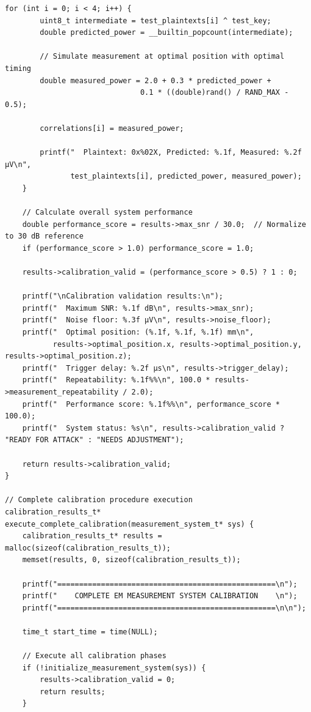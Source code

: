 \documentclass[11pt,a4paper]{article}
\theoremstyle{definition}
\begin{document}
\begin{lstlisting}[caption={Complete EM Calibration Implementation}]
    for (int i = 0; i < 4; i++) {
        uint8_t intermediate = test_plaintexts[i] ^ test_key;
        double predicted_power = __builtin_popcount(intermediate);
        
        // Simulate measurement at optimal position with optimal timing
        double measured_power = 2.0 + 0.3 * predicted_power + 
                               0.1 * ((double)rand() / RAND_MAX - 0.5);
        
        correlations[i] = measured_power;
        
        printf("  Plaintext: 0x%02X, Predicted: %.1f, Measured: %.2f μV\n",
               test_plaintexts[i], predicted_power, measured_power);
    }
    
    // Calculate overall system performance
    double performance_score = results->max_snr / 30.0;  // Normalize to 30 dB reference
    if (performance_score > 1.0) performance_score = 1.0;
    
    results->calibration_valid = (performance_score > 0.5) ? 1 : 0;
    
    printf("\nCalibration validation results:\n");
    printf("  Maximum SNR: %.1f dB\n", results->max_snr);
    printf("  Noise floor: %.3f μV\n", results->noise_floor);
    printf("  Optimal position: (%.1f, %.1f, %.1f) mm\n", 
           results->optimal_position.x, results->optimal_position.y, results->optimal_position.z);
    printf("  Trigger delay: %.2f μs\n", results->trigger_delay);
    printf("  Repeatability: %.1f%%\n", 100.0 * results->measurement_repeatability / 2.0);
    printf("  Performance score: %.1f%%\n", performance_score * 100.0);
    printf("  System status: %s\n", results->calibration_valid ? "READY FOR ATTACK" : "NEEDS ADJUSTMENT");
    
    return results->calibration_valid;
}

// Complete calibration procedure execution
calibration_results_t* execute_complete_calibration(measurement_system_t* sys) {
    calibration_results_t* results = malloc(sizeof(calibration_results_t));
    memset(results, 0, sizeof(calibration_results_t));
    
    printf("==================================================\n");
    printf("    COMPLETE EM MEASUREMENT SYSTEM CALIBRATION    \n");
    printf("==================================================\n\n");
    
    time_t start_time = time(NULL);
    
    // Execute all calibration phases
    if (!initialize_measurement_system(sys)) {
        results->calibration_valid = 0;
        return results;
    }
    

\end{lstlisting}
\end{document}
